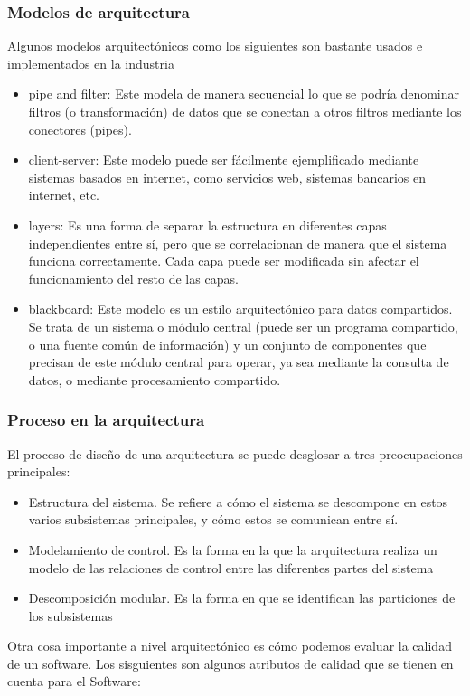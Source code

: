 \subsubsection{Modelos de arquitectura} Algunos modelos arquitectónicos como los siguientes son bastante usados e implementados en la industria 
\begin{itemize}
    \item pipe and filter: Este modela de manera secuencial lo que se podría denominar filtros (o transformación) de datos que se conectan a otros filtros mediante los conectores (pipes).
    \item client-server: Este modelo puede ser fácilmente ejemplificado mediante sistemas basados en internet, como servicios web, sistemas bancarios en internet, etc.
    \item layers: Es una forma de separar la estructura en diferentes capas independientes entre sí, pero que se correlacionan de manera que el sistema funciona correctamente. Cada capa puede ser modificada sin afectar el funcionamiento del resto de las capas.
    \item blackboard: Este modelo es un estilo arquitectónico para datos compartidos. Se trata de un sistema o módulo central (puede ser un programa compartido, o una fuente común de información) y un conjunto de componentes que precisan de este módulo central para operar, ya sea mediante la consulta de datos, o mediante procesamiento compartido.  
\end{itemize}

\subsubsection{Proceso en la arquitectura} El proceso de diseño de una arquitectura se puede desglosar a tres preocupaciones principales:
\begin{itemize}
    \item Estructura del sistema. Se refiere a cómo el sistema se descompone en estos varios subsistemas principales, y cómo estos se comunican entre sí. 
    \item Modelamiento de control. Es la forma en la que la arquitectura realiza un modelo de las relaciones de control entre las diferentes partes del sistema
    \item Descomposición modular. Es la forma en que se identifican las particiones de los subsistemas
\end{itemize}

Otra cosa importante a nivel arquitectónico es cómo podemos evaluar la calidad de un software. Los sisguientes son algunos atributos de calidad que se tienen en cuenta para el Software:

